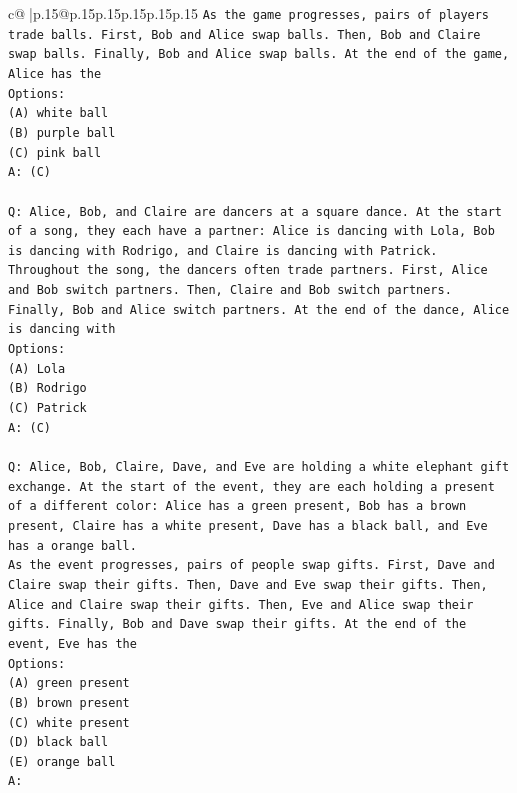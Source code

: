 \documentclass{article}
\begin{document}
{\begin{supertabular}{c@{$\;$}|p{.15\linewidth}@{}p{.15\linewidth}p{.15\linewidth}p{.15\linewidth}p{.15\linewidth}p{.15\linewidth}}
{{{\texttt{As the game progresses, pairs of players trade balls. First, Bob and Alice swap balls. Then, Bob and Claire swap balls. Finally, Bob and Alice swap balls. At the end of the game, Alice has the} \\
\texttt{Options:} \\
\texttt{(A) white ball} \\
\texttt{(B) purple ball} \\
\texttt{(C) pink ball} \\
\texttt{A: (C)} \\
\\ 
\texttt{Q: Alice, Bob, and Claire are dancers at a square dance. At the start of a song, they each have a partner: Alice is dancing with Lola, Bob is dancing with Rodrigo, and Claire is dancing with Patrick.} \\
\texttt{Throughout the song, the dancers often trade partners. First, Alice and Bob switch partners. Then, Claire and Bob switch partners. Finally, Bob and Alice switch partners. At the end of the dance, Alice is dancing with} \\
\texttt{Options:} \\
\texttt{(A) Lola} \\
\texttt{(B) Rodrigo} \\
\texttt{(C) Patrick} \\
\texttt{A: (C)} \\
\\ 
\texttt{Q: Alice, Bob, Claire, Dave, and Eve are holding a white elephant gift exchange. At the start of the event, they are each holding a present of a different color: Alice has a green present, Bob has a brown present, Claire has a white present, Dave has a black ball, and Eve has a orange ball.} \\
\texttt{As the event progresses, pairs of people swap gifts. First, Dave and Claire swap their gifts. Then, Dave and Eve swap their gifts. Then, Alice and Claire swap their gifts. Then, Eve and Alice swap their gifts. Finally, Bob and Dave swap their gifts. At the end of the event, Eve has the} \\
\texttt{Options:} \\
\texttt{(A) green present} \\
\texttt{(B) brown present} \\
\texttt{(C) white present} \\
\texttt{(D) black ball} \\
\texttt{(E) orange ball} \\
\texttt{A:} \\
            }
        }
    }
     \\ \\


\end{supertabular}}
\end{document}
